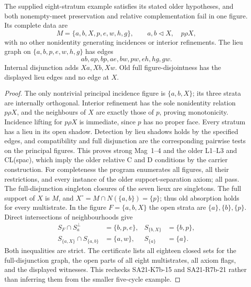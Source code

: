 \begin{counterexample}
\label{SA21-A24}
The supplied eight-stratum example satisfies its stated older
hypotheses, and both nonempty-meet preservation and relative
complementation fail in one figure. Its complete data are
\[
 M=\{a,b,X,p,e,w,h,g\},\qquad a,b\lhd X,\quad p\rho X,
\]
with no other nonidentity generating incidences or interior
refinements. The lieu graph on $\{a,b,p,e,w,h,g\}$ has edges
\[
 ab,ap,bp,ae,bw,pw,eh,hg,gw.
\]
Internal disjunction adds $Xa,Xb,Xw$. Old full figure-disjointness
has the displayed lieu edges and no edge at $X$.
\end{counterexample}
\begin{proof}
The only nontrivial principal incidence figure is $\{a,b,X\}$;
its three strata are internally orthogonal. Interior refinement
has the sole nonidentity relation $p\rho X$, and the neighbours
of $X$ are exactly those of $p$, proving monotonicity. Incidence
lifting for $p\rho X$ is immediate, since $p$ has no proper face.
Every stratum has a lieu in its open shadow. Detection by lieu
shadows holds by the specified edges, and compatibility and full
disjunction are the corresponding pairwise tests on the principal
figures. This proves strong Mag~1--4 and the older L1--L3 and
CL(spac), which imply the older relative C and D conditions by the
carrier construction. For completeness the program enumerates all
figures, all their restrictions, and every instance of the older
support-separation axiom; all pass.
The full-disjunction singleton closures of the seven lieux are
singletons. The full support of $X$ is $M$, and
$X^\circ=M\cap N(\{a,b\})=\{p\}$; thus old absorption holds for
every multistrate. In the figure $F=\{a,b,X\}$ the open strata are
$\{a\},\{b\},\{p\}$. Direct intersections of neighbourhoods give
\[
\begin{aligned}
 S_F\cap S_a^\perp&=\{b,p,e\},& S_{\{b,X\}}&=\{b,p\},\\
 S_{\{a,X\}}\cap S_{\{a,b\}}&=\{a,w\},&S_{\{a\}}&=\{a\}.
\end{aligned}
\]
Both inequalities are strict. The certificate lists all eighteen
closed sets for the full-disjunction graph, the open parts of all
eight multistrates, all axiom flags, and the displayed witnesses.
This rechecks SA21-K7b-15 and SA21-R7b-21 rather than inferring them
from the smaller five-cycle example.
\end{proof}

